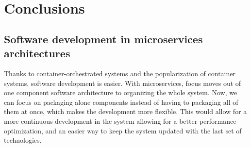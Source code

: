 
\chapter{Conclusions} %

\label{Chapter10} %

\section{Software development in microservices architectures}

Thanks to container-orchestrated systems and the popularization of container systems, software development is easier. With microservices, focus moves out of one component software architecture to organizing the whole system. Now, we can focus on packaging alone components instead of having to packaging all of them at once, which makes the development more flexible. This would allow for a more continuous development in the system allowing for a better performance optimization, and an easier way to keep the system updated with the last set of technologies.
